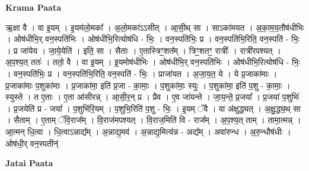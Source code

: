 \documentclass[17pt]{extarticle}
\begin{document}
\textbf{Krama Paata} \newline

ऋ॒क्षा वै । वा इ॒यम् । इ॒यम॑लो॒मका᳚ । अ॒लो॒मका॑ऽऽसीत् । आ॒सी॒थ् सा । साऽका॑मयत । अ॒का॒म॒य॒तौष॑धीभिः । ओष॑धीभि॒र् वन॒स्पति॑भिः । ओष॑धीभि॒रित्योष॑धि - भिः॒ । वन॒स्पति॑भिः॒ प्र । वन॒स्पति॑भि॒रिति॒ वन॒स्पति॑ - भिः॒ । प्र जा॑येय । जा॒ये॒येति॑ । इति॒ सा । सैताः । ए॒तास्त्रिꣳ॒॒शत᳚म् । त्रिꣳ॒॒शतꣳ॒॒ रात्रीः᳚ । रात्री॑रपश्यत् । अ॒प॒श्य॒त् ततः॑ । ततो॒ वै । वा इ॒यम् । इ॒यमोष॑धीभिः । ओष॑धीभि॒र् वन॒स्पति॑भिः । ओष॑धीभि॒रित्योष॑धि - भिः॒ । वन॒स्पति॑भिः॒ प्र । वन॒स्पति॑भि॒रिति॒ वन॒स्पति॑ - भिः॒ । प्राजा॑यत । अ॒जा॒य॒त॒ ये । ये प्र॒जाका॑माः । प्र॒जाका॑माः प॒शुका॑माः । प्र॒जाका॑मा॒ इति॑ प्र॒जा - का॒माः॒ । प॒शुका॑माः॒ स्युः । प॒शुका॑मा॒ इति॑ प॒शु - का॒माः॒ । स्युस्ते । त ए॒ताः । ए॒ता आ॑सीरन्न् । आ॒सी॒र॒न् प्र । प्रैव । ए॒व जा॑यन्ते । जा॒य॒न्ते॒ प्र॒जया᳚ । प्र॒जया॑ प॒शुभिः॑ । प्र॒जयेति॑ प्र - जया᳚ । प॒शुभि॑रि॒यम् । प॒शुभि॒रिति॑ प॒शु - भिः॒ । इ॒यम् ॅवै । वा अ॑क्षुद्ध्यत् । अ॒क्षु॒द्ध्य॒थ् सा । सैताम् । ए॒ताम् ॅवि॒राज᳚म् । वि॒राज॑मपश्यत् । वि॒राज॒मिति॑ वि - राज᳚म् । अ॒प॒श्य॒त् ताम् । तामा॒त्मन्न् । आ॒त्मन् धि॒त्वा । धि॒त्वाऽन्नाद्य᳚म् । अ॒न्नाद्य॒मव॑ । अ॒न्नाद्य॒मित्य॑न्न - अद्य᳚म् । अवा॑रुन्ध । अ॒रु॒न्धौष॑धीः । ओष॑धी॒र् वन॒स्पतीन्॑ \newline

\textbf{Jatai Paata} \newline
\end{document}
